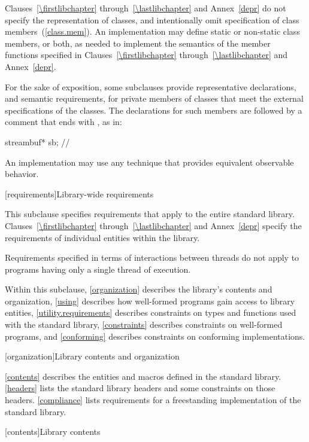 \pnum
Clauses~\ref{\firstlibchapter} through~\ref{\lastlibchapter} and
Annex~\ref{depr} do not specify the representation of classes, and intentionally
omit specification of class members~(\ref{class.mem}). An implementation may
define static or non-static class members, or both, as needed to implement the
semantics of the member functions specified in Clauses~\ref{\firstlibchapter}
through~\ref{\lastlibchapter} and Annex~\ref{depr}.

\pnum
For the sake of exposition,
some subclauses provide representative declarations, and semantic requirements, for
private members of classes that meet the external specifications of the classes.
The declarations for such members are
followed by a comment that ends with \expos, as in:

\begin{codeblock}
streambuf* sb;  // \expos
\end{codeblock}

\pnum
An implementation may use any technique that provides equivalent observable behavior.

[requirements]{Library-wide requirements}

\pnum
This subclause specifies requirements that apply to the entire \Cpp standard library.
Clauses~\ref{\firstlibchapter} through~\ref{\lastlibchapter} and Annex~\ref{depr}
specify the requirements of individual entities within the library.

\pnum
Requirements specified in terms of interactions between threads do not apply to
programs having only a single thread of execution.

\pnum
Within this subclause, \ref{organization} describes the library's contents and
organization, \ref{using} describes how well-formed \Cpp programs gain access to library
entities,
\ref{utility.requirements} describes constraints on types and functions used with
the \Cpp standard library,
\ref{constraints} describes constraints on well-formed \Cpp programs, and
\ref{conforming} describes constraints on conforming implementations.

[organization]{Library contents and organization}

\pnum
\ref{contents} describes the entities and macros defined in the \Cpp standard library.
\ref{headers} lists the standard library headers and some constraints on those headers.
\ref{compliance} lists requirements for a freestanding implementation of the \Cpp
standard library.

[contents]{Library contents}

